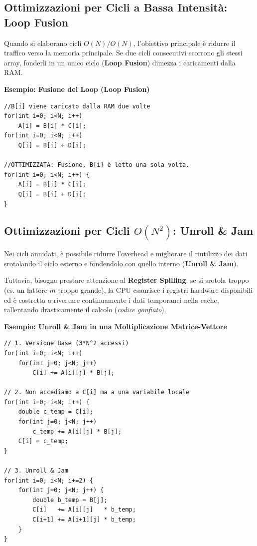 \subsection{Ottimizzazioni per Cicli a Bassa Intensità: Loop Fusion}
Quando si elaborano cicli $O(N)/O(N)$, l'obiettivo principale è ridurre il traffico verso la memoria principale. Se due cicli consecutivi scorrono gli stessi array, fonderli in un unico ciclo (\textbf{Loop Fusion}) dimezza i caricamenti dalla RAM.

\begin{framed}
\noindent
\footnotesize
\textbf{Esempio: Fusione dei Loop (Loop Fusion)}
\begin{verbatim}
//B[i] viene caricato dalla RAM due volte
for(int i=0; i<N; i++) 
    A[i] = B[i] * C[i];
for(int i=0; i<N; i++) 
    Q[i] = B[i] + D[i];

//OTTIMIZZATA: Fusione, B[i] è letto una sola volta.
for(int i=0; i<N; i++) {
    A[i] = B[i] * C[i];
    Q[i] = B[i] + D[i];
}
\end{verbatim}
\end{framed}

\subsection{Ottimizzazioni per Cicli $O(N^2)$: Unroll \& Jam}
Nei cicli annidati, è possibile ridurre l'overhead e migliorare il riutilizzo dei dati srotolando il ciclo esterno e fondendolo con quello interno (\textbf{Unroll \& Jam}). 

Tuttavia, bisogna prestare attenzione al \textbf{Register Spilling}: se si srotola troppo (es. un fattore $m$ troppo grande), la CPU esaurisce i registri hardware disponibili ed è costretta a riversare continuamente i dati temporanei nella cache, rallentando drasticamente il calcolo (\textit{codice gonfiato}).

\begin{framed}
\footnotesize
\noindent
\textbf{Esempio: Unroll \& Jam in una Moltiplicazione Matrice-Vettore}
\begin{verbatim}
// 1. Versione Base (3*N^2 accessi)
for(int i=0; i<N; i++)
    for(int j=0; j<N; j++)
        C[i] += A[i][j] * B[j];

// 2. Non accediamo a C[i] ma a una variabile locale
for(int i=0; i<N; i++) {
    double c_temp = C[i];
    for(int j=0; j<N; j++)
        c_temp += A[i][j] * B[j];
    C[i] = c_temp;
}

// 3. Unroll & Jam
for(int i=0; i<N; i+=2) {
    for(int j=0; j<N; j++) {
        double b_temp = B[j];
        C[i]   += A[i][j]   * b_temp;
        C[i+1] += A[i+1][j] * b_temp;
    }
}
\end{verbatim}
\end{framed}

